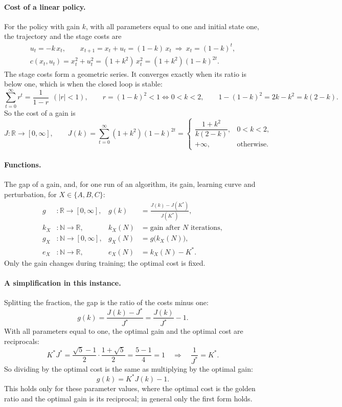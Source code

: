 \documentclass[11pt]{article}
\begin{document}
\paragraph{Cost of a linear policy.} For the policy with gain $k$, with all parameters equal to one
and initial state one, the trajectory and the stage costs are
\begin{gather*}
  u_t = -k\, x_t, \qquad x_{t+1} = x_t + u_t = (1 - k)\, x_t \ \Longrightarrow\ x_t = (1 - k)^t, \\
  c(x_t, u_t) = x_t^2 + u_t^2 = (1 + k^2)\, x_t^2 = (1 + k^2)(1 - k)^{2t}.
\end{gather*}
The stage costs form a geometric series. It converges exactly when its ratio is below one, which is
when the closed loop is stable:
\[
  \sum_{t=0}^{\infty} r^t = \frac{1}{1 - r} \ \ (|r| < 1), \qquad
  r = (1 - k)^2 < 1 \iff 0 < k < 2, \qquad
  1 - (1 - k)^2 = 2k - k^2 = k(2 - k).
\]
So the cost of a gain is
\[
  J : \mathbb{R} \to [0, \infty], \qquad
  J(k) = \sum_{t=0}^{\infty} (1 + k^2)(1 - k)^{2t}
  = \begin{cases} \dfrac{1 + k^2}{k(2 - k)}, & 0 < k < 2, \\[1ex] +\infty, & \text{otherwise.} \end{cases}
\]

\paragraph{Functions.} The gap of a gain, and, for one run of an algorithm, its gain, learning curve
and perturbation, for $X \in \{A, B, C\}$:
\begin{align*}
  g &: \mathbb{R} \to [0, \infty], & g(k) &= \frac{J(k) - J(K^*)}{J(K^*)}, \\
  k_X &: \mathbb{N} \to \mathbb{R}, & k_X(N) &= \text{gain after } N \text{ iterations}, \\
  g_X &: \mathbb{N} \to [0, \infty], & g_X(N) &= g\big(k_X(N)\big), \\
  e_X &: \mathbb{N} \to \mathbb{R}, & e_X(N) &= k_X(N) - K^* .
\end{align*}
Only the gain changes during training; the optimal cost is fixed.

\paragraph{A simplification in this instance.} Splitting the fraction, the gap is the ratio of the
costs minus one:
\[
  g(k) = \frac{J(k) - J^*}{J^*} = \frac{J(k)}{J^*} - 1 .
\]
With all parameters equal to one, the optimal gain and the optimal cost are reciprocals:
\[
  K^* J^* = \frac{\sqrt{5} - 1}{2} \cdot \frac{1 + \sqrt{5}}{2} = \frac{5 - 1}{4} = 1
  \quad\Longrightarrow\quad \frac{1}{J^*} = K^* .
\]
So dividing by the optimal cost is the same as multiplying by the optimal gain:
\[
  g(k) = K^* J(k) - 1 .
\]
This holds only for these parameter values, where the optimal cost is the golden ratio and the
optimal gain is its reciprocal; in general only the first form holds.
\end{document}
